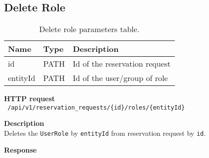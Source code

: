 \subsection{Delete Role}
\begin{table}[ht!]
    \begin{tabularx}{\textwidth}{llX}
        \toprule
        Name & Type & Description \\
        \midrule
        id & PATH & Id of the reservation request \\
        entityId & PATH & Id of the user/group of role \\
        \end{tabularx}
    \caption{Delete role parameters table.}
\end{table}
\begin{description}
    \item \textbf{HTTP request}\\
        \texttt{\text{[DELETE]} /api/v1/reservation\_requests/\{id\}/roles/\{entityId\}}
    \item \textbf{Description}\\
        Deletes the \texttt{UserRole} by \texttt{entityId} from reservation request by \texttt{id}.
    \item \textbf{Response}\\
        \texttt{\text{[200 OK]}}
\end{description}
